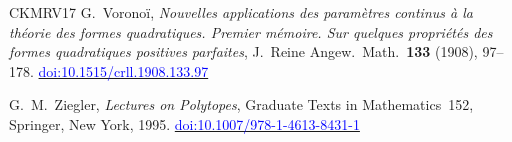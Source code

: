 \documentclass[11pt,reqno]{amsart}
\newcommand{\bluelink}[2]{\href{#1}{\textcolor{blue}{#2}}}
\renewcommand{\_}{\origunderscore\allowbreak}
\numberwithin{equation}{section}
\theoremstyle{plain}
\theoremstyle{definition}
\theoremstyle{remark}
\begin{document}
\begin{thebibliography}{CKMRV17}
G.~Vorono\"i,
\textit{Nouvelles applications des param\`etres continus \`a la th\'eorie des
formes quadratiques. Premier m\'emoire. Sur quelques propri\'et\'es des formes
quadratiques positives parfaites},
J.\ Reine Angew.\ Math.\ \textbf{133} (1908), 97--178.
\bluelink{https://doi.org/10.1515/crll.1908.133.97}{doi:10.1515/crll.1908.133.97}

G.~M.~Ziegler,
\textit{Lectures on Polytopes},
Graduate Texts in Mathematics~152, Springer, New York, 1995.
\bluelink{https://doi.org/10.1007/978-1-4613-8431-1}{doi:10.1007/978-1-4613-8431-1}

\end{thebibliography}
\end{document}
